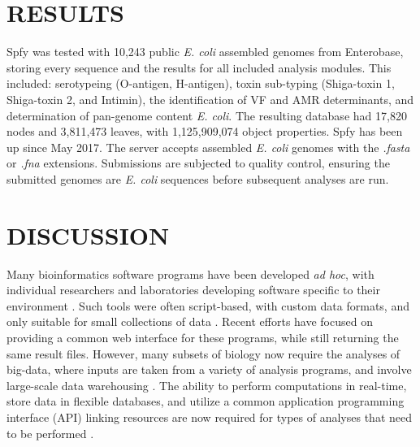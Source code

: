 \documentclass{article}
\begin{document}
\section{RESULTS}
Spfy was tested with 10,243 public \textit{E. coli} assembled genomes from Enterobase, storing every sequence and the results for all included analysis modules. This included: serotypeing (O-antigen, H-antigen), toxin sub-typing (Shiga-toxin 1, Shiga-toxin 2, and Intimin), the identification of VF and AMR determinants, and determination of pan-genome content \textit{E. coli}.
The resulting database had 17,820 nodes and 3,811,473 leaves, with 1,125,909,074 object properties.
Spfy has been up since May 2017. The server accepts assembled \textit{E. coli} genomes with the \textit{.fasta} or \textit{.fna} extensions. Submissions are subjected to quality control, ensuring the submitted genomes are \textit{E. coli} sequences before subsequent analyses are run.
\par

\small 




\section{DISCUSSION}

Many bioinformatics software programs have been developed \textit{ad hoc}, with individual researchers and laboratories developing software specific to their environment \cite{de2015trends}.
Such tools were often script-based, with custom data formats, and only suitable for small collections of data \cite{de2015trends}.
Recent efforts \cite{goecks2010galaxy,thomsen2016bacterial} have focused on providing a common web interface for these programs, while still returning the same result files.
However, many subsets of biology now require the analyses of big-data, where inputs are taken from a variety of analysis programs, and involve large-scale data warehousing \cite{schatz2015biological}.
The ability to perform computations in real-time, store data in flexible databases, and utilize a common application programming interface (API) linking resources are now required for types of analyses that need to be performed \cite{swaminathan2016review}.
\end{document}
